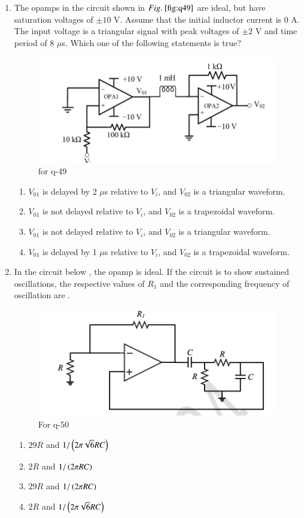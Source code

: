 \documentclass[journal,12pt,onecolumn]{IEEEtran}
\theoremstyle{remark}
\begin{document}
\begin{enumerate}
\item The opamps in the circuit shown in $\figref{fig:q49}$ are ideal, but have saturation voltages of $\pm10$ V. Assume that the initial inductor current is 0 A. The input voltage  is a triangular signal with peak voltages of $\pm2$ V and time period of 8 $\mu$s. Which one of the following statements is true?
\begin{figure}[H]
    \centering
    \includegraphics[width=0.6\columnwidth]{q49.png}
    \caption{for q-49}
    \label{fig:q49}
\end{figure}
\hfill{}
\begin{enumerate}
    \item $V_{01}$ is delayed by 2 $\mu$s relative to $V_i$, and $V_{02}$ is a triangular waveform.
    \item $V_{01}$ is not delayed relative to $V_i$, and $V_{02}$ is a trapezoidal waveform.
    \item $V_{01}$ is not delayed relative to $V_i$, and $V_{02}$ is a triangular waveform.
    \item $V_{01}$ is delayed by 1 $\mu$s relative to $V_i$, and $V_{02}$ is a trapezoidal waveform.
\end{enumerate}

\item In the circuit below , the opamp is ideal. If the circuit is to show sustained oscillations, the respective values of $R_1$ and the corresponding frequency of oscillation are \underline{\hspace{2cm}}.
\begin{figure}[H]
    \centering
    \includegraphics[width=0.5\columnwidth]{q50.png}
    \caption{For q-50}
    \label{fig:q50}
\end{figure}
\hfill{}
\begin{multicols}{2}
\begin{enumerate}
    \item $29R$ and $1/\left(2\pi\sqrt{6}RC\right)$
    \item $2R$ and $1/\left(2\pi RC\right)$
    \item $29R$ and $1/\left(2\pi RC\right)$
    \item $2R$ and $1/\left(2\pi\sqrt{6}RC\right)$
\end{enumerate}
\end{multicols}


\end{enumerate}
\end{document}
